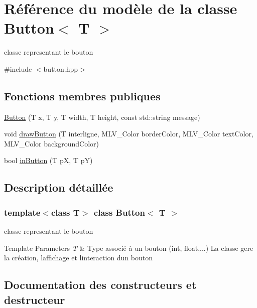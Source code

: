 \hypertarget{class_button}{}\section{Référence du modèle de la classe Button$<$ T $>$}
\label{class_button}


classe representant le bouton  




{\ttfamily \#include $<$button.\+hpp$>$}

\subsection*{Fonctions membres publiques}
\begin{DoxyCompactItemize}
\item 
\hyperlink{class_button_a880eb6c29a2ce7f8b9b22f679fc2052c}{Button} (T x, T y, T width, T height, const std\+::string message)
\item 
void \hyperlink{class_button_a1f70ff604d61122e4f39ce9f557023f9}{draw\+Button} (T interligne, M\+L\+V\+\_\+\+Color border\+Color, M\+L\+V\+\_\+\+Color text\+Color, M\+L\+V\+\_\+\+Color background\+Color)
\item 
bool \hyperlink{class_button_abf96b770958cdea40cceab85271a8ff0}{in\+Button} (T pX, T pY)
\end{DoxyCompactItemize}


\subsection{Description détaillée}
\subsubsection*{template$<$class T$>$\newline
class Button$<$ T $>$}

classe representant le bouton 


\begin{DoxyTemplParams}{Template Parameters}
{\em T} & Type associé à un bouton (int, float,...) La classe gere la création, l\textquotesingle{}affichage et l\textquotesingle{}interaction d\textquotesingle{}un bouton \\
\hline
\end{DoxyTemplParams}


\subsection{Documentation des constructeurs et destructeur}
\mbox{\label{class_button_a880eb6c29a2ce7f8b9b22f679fc2052c}} 
